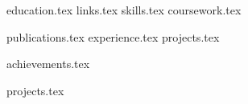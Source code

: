 \documentclass[]{deedy-resume-openfont}
\newcommand*{\pgonecolone}{pg_1_column_1/}
\newcommand*{\pgonecoltwo}{pg_1_column_2/}
\newcommand*{\pgtwocolone}{pg_2_column_1/}
\newcommand*{\pgtwocoltwo}{pg_2_column_2/}
\begin{document}
%
%


%
%



%
%

\begin{minipage}[t]{0.33\textwidth} 

{education.tex}
{links.tex}
{skills.tex}
{coursework.tex}


%
%

\end{minipage} 
\hfill
\begin{minipage}[t]{0.65\textwidth} 

{publications.tex}
{experience.tex}
{projects.tex}

\end{minipage} 


%
%

\begin{minipage}[t]{0.33\textwidth} 

{achievements.tex}


%
%

\end{minipage} 
\hfill
\begin{minipage}[t]{0.65\textwidth} 

{projects.tex}

\end{minipage} 
\end{document}
